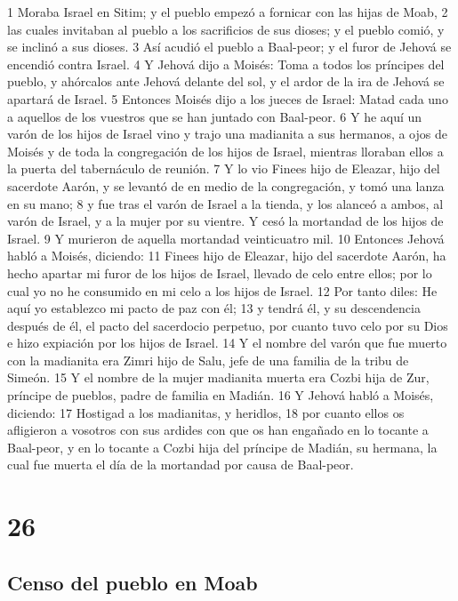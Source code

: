 1 Moraba Israel en Sitim; y el pueblo empezó a fornicar con las hijas de Moab,
2 las cuales invitaban al pueblo a los sacrificios de sus dioses; y el pueblo comió, y se inclinó a sus dioses.
3 Así acudió el pueblo a Baal-peor; y el furor de Jehová se encendió contra Israel.
4 Y Jehová dijo a Moisés: Toma a todos los príncipes del pueblo, y ahórcalos ante Jehová delante del sol, y el ardor de la ira de Jehová se apartará de Israel.
5 Entonces Moisés dijo a los jueces de Israel: Matad cada uno a aquellos de los vuestros que se han juntado con Baal-peor.
6 Y he aquí un varón de los hijos de Israel vino y trajo una madianita a sus hermanos, a ojos de Moisés y de toda la congregación de los hijos de Israel, mientras lloraban ellos a la puerta del tabernáculo de reunión.
7 Y lo vio Finees hijo de Eleazar, hijo del sacerdote Aarón, y se levantó de en medio de la congregación, y tomó una lanza en su mano;
8 y fue tras el varón de Israel a la tienda, y los alanceó a ambos, al varón de Israel, y a la mujer por su vientre. Y cesó la mortandad de los hijos de Israel.
9 Y murieron de aquella mortandad veinticuatro mil.
10 Entonces Jehová habló a Moisés, diciendo:
11 Finees hijo de Eleazar, hijo del sacerdote Aarón, ha hecho apartar mi furor de los hijos de Israel, llevado de celo entre ellos; por lo cual yo no he consumido en mi celo a los hijos de Israel.
12 Por tanto diles: He aquí yo establezco mi pacto de paz con él;
13 y tendrá él, y su descendencia después de él, el pacto del sacerdocio perpetuo, por cuanto tuvo celo por su Dios e hizo expiación por los hijos de Israel.
14 Y el nombre del varón que fue muerto con la madianita era Zimri hijo de Salu, jefe de una familia de la tribu de Simeón.
15 Y el nombre de la mujer madianita muerta era Cozbi hija de Zur, príncipe de pueblos, padre de familia en Madián.
16 Y Jehová habló a Moisés, diciendo:
17 Hostigad a los madianitas, y heridlos,
18 por cuanto ellos os afligieron a vosotros con sus ardides con que os han engañado en lo tocante a Baal-peor, y en lo tocante a Cozbi hija del príncipe de Madián, su hermana, la cual fue muerta el día de la mortandad por causa de Baal-peor.

\chapter{26}

\section*{Censo del pueblo en Moab}


